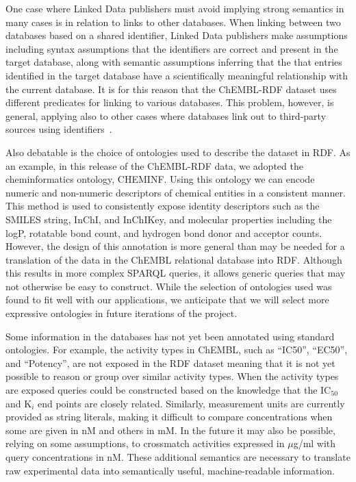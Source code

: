 \documentclass[10pt]{bmc_article}
\newenvironment{bmcformat}{\begin{raggedright}\baselineskip20pt\sloppy\setboolean{publ}{false}}{\end{raggedright}\baselineskip20pt\sloppy}
\begin{document}
\begin{bmcformat}
One case where Linked Data publishers must avoid implying strong semantics in many cases is
in relation to links to other databases. When linking between two databases based on a shared identifier,
Linked Data publishers make assumptions including syntax assumptions that the identifiers 
are correct and present in the target database, along with semantic assumptions inferring that the
that entries identified in the target database have a scientifically meaningful relationship with the current database.
It is for this reason that the ChEMBL-RDF dataset uses different predicates for linking to various databases.
This problem, however, is general, applying also to other cases where databases link out to third-party sources using identifiers~\cite{VanIersel2010}.

Also debatable is the choice of ontologies used to describe the dataset in RDF. As an example, in this release of the
ChEMBL-RDF data, we adopted the cheminformatics ontology, CHEMINF. Using this ontology
we can encode numeric and non-numeric descriptors of chemical entities in a consistent
manner. This method is used to consistently expose identity descriptors such
as the SMILES string, InChI, and InChIKey, and molecular properties including the
logP, rotatable bond count, and hydrogen bond donor and acceptor counts.
However, the design of this annotation is more general than may be needed for a translation
of the data in the ChEMBL relational database into RDF. Although this results in more 
complex SPARQL queries, it allows generic queries that may not otherwise be easy to construct.
While the selection of ontologies used was found to fit well with our applications,
we anticipate that we will select more expressive ontologies in future iterations of the project.

Some information in the databases has not yet been annotated using standard ontologies. 
For example, the activity types in ChEMBL, such as ``IC50'', ``EC50'', and ``Potency'', are not exposed in the RDF dataset
meaning that it is not yet possible to reason or group over similar activity types.
When the activity types are exposed queries could be constructed based on the knowledge 
that the IC$_{50}$ and K$_i$ end points are closely related. Similarly, measurement units are currently provided as
string literals, making it difficult to compare concentrations when some are given in nM and others in mM.
In the future it may also be possible, relying on some assumptions, to crossmatch activities
expressed in $\mu$g/ml with query concentrations in nM. These additional semantics are necessary 
to translate raw experimental data into semantically useful, machine-readable information.


\end{bmcformat}
\end{document}
